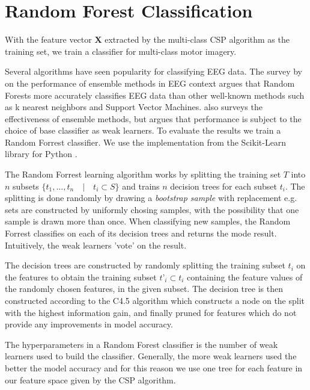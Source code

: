 \section{Random Forest Classification}

With the feature vector $\mathbf{X}$ extracted by the multi-class CSP algorithm as the training set, we train a classifier for multi-class motor imagery.

Several algorithms have seen popularity for classifying EEG data. The survey by \citet{chan2015systematic} on the performance of ensemble methods in EEG context argues that Random Forests more accurately classifies EEG data than other well-known methods such as k nearest neighbors and Support Vector Machines. \citet{sun2007experimental} also surveys the effectiveness of ensemble methods, but argues that performance is subject to the choice of base classifier as weak learners. To evaluate the results we train a Random Forrest classifier. We use the implementation from the Scikit-Learn library for Python \citep{scikit-learn}.   

The Random Forrest learning algorithm works by splitting the training set $T$ into $n$ subsets $\{t_1,…,t_n \quad | \quad t_i \subset S\}$ and trains $n$ decision trees for each subset $t_i$. The splitting is done randomly by drawing a \emph{bootstrap sample} with replacement e.g. sets are constructed by uniformly chosing samples, with the possibility that one sample is drawn more than once. When classifying new samples, the Random Forrest classifies on each of its decision trees and returns the mode result. Intuitively, the weak learners 'vote' on the result.

The decision trees are constructed by randomly splitting the training subset $t_i$ on the features to obtain the training subset $t’_i \subset t_i$ containing the feature values of the randomly chosen features, in the given subset. The decision tree is then constructed according to the C4.5 algorithm which constructs a node on the split with the highest information gain, and finally pruned for features which do not provide any improvements in model accuracy.

The hyperparameters in a Random Forest classifier is the number of weak learners used to build the classifier. Generally, the more weak learners used the better the model accuracy and for this reason we use one tree for each feature in our feature space given by the CSP algorithm. 
